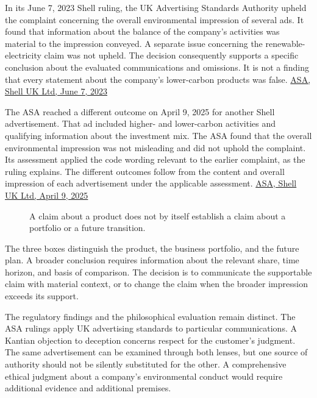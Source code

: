 In its June 7, 2023 Shell ruling, the UK Advertising Standards Authority
upheld the complaint concerning the overall environmental impression of
several ads. It found that information about the balance of the
company's activities was material to the impression conveyed. A separate
issue concerning the renewable-electricity claim was not upheld. The
decision consequently supports a specific conclusion about the evaluated
communications and omissions. It is not a finding that every statement
about the company's lower-carbon products was false.
\href{https://www.asa.org.uk/rulings/shell-uk-ltd-g22-1170842-shell-uk-ltd.html}{ASA,
Shell UK Ltd, June 7, 2023}

The ASA reached a different outcome on April 9, 2025 for another Shell
advertisement. That ad included higher- and lower-carbon activities and
qualifying information about the investment mix. The ASA found that the
overall environmental impression was not misleading and did not uphold
the complaint. Its assessment applied the code wording relevant to the
earlier complaint, as the ruling explains. The different outcomes follow
from the content and overall impression of each advertisement under the
applicable assessment.
\href{https://www.asa.org.uk/rulings/shell-uk-ltd-g24-1248246-shell-uk-ltd.html}{ASA,
Shell UK Ltd, April 9, 2025}

\begin{figure}[htbp]
\centering

\caption{A claim about a product does not by itself establish a claim about a portfolio or a future transition.}\label{fig:M09_environmental_scope}
\end{figure}

The three boxes distinguish the product, the business portfolio, and the
future plan. A broader conclusion requires information about the
relevant share, time horizon, and basis of comparison. The decision is
to communicate the supportable claim with material context, or to change
the claim when the broader impression exceeds its support.

The regulatory findings and the philosophical evaluation remain
distinct. The ASA rulings apply UK advertising standards to particular
communications. A Kantian objection to deception concerns respect for
the customer's judgment. The same advertisement can be examined through
both lenses, but one source of authority should not be silently
substituted for the other. A comprehensive ethical judgment about a
company's environmental conduct would require additional evidence and
additional premises.

